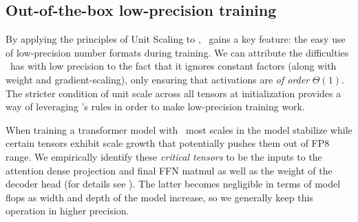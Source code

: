 \subsection{Out-of-the-box low-precision training} \label{sec:umup:low_prec_training}

By applying the principles of Unit Scaling to \mup, \umup\ gains a key feature: the easy use of low-precision number formats during training. We can attribute the difficulties \mup\ has with low precision to the fact that it ignores constant factors (along with weight and gradient-scaling), only ensuring that activations are \textit{of order} $\Theta(1)$. The stricter condition of unit scale across all tensors at initialization provides a way of leveraging \mup's rules in order to make low-precision training work.


When training a transformer model with \umup\, most scales in the model stabilize while certain tensors exhibit scale growth that potentially pushes them out of FP8 range. We empirically identify these \textit{critical tensors} to be the inputs to the attention dense projection and final FFN matmul as well as the weight of the decoder head (for details see ). The latter becomes negligible in terms of model flops as width and depth of the model increase, so we generally keep this operation in higher precision. 

